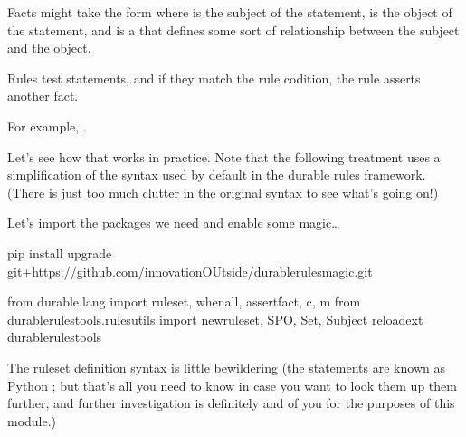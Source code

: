 \documentclass[letterpaper,10pt,english]{sphinxmanual}
\begin{document}
{Facts might take the form  where  is the subject of the statement,  is the object of the statement, and  is a  that defines some sort of relationship between the subject and the object.

Rules test statements, and if they match the rule codition, the rule asserts another fact.

For example, .

Let’s see how that works in practice. Note that the following treatment uses a simplification of the syntax used by default in the durable rules framework. (There is just too much clutter in the original syntax to see what’s going on!)

Let’s import the packages we need and enable some magic…

{
\begin{sphinxVerbatim}[commandchars=\\\{\}]
\llap{\color{nbsphinxin}[ ]:\,\hspace{\fboxrule}\hspace{\fboxsep}}\PYGZsh{}\PYGZpc{}pip install  \PYGZhy{}\PYGZhy{}upgrade git+https://github.com/innovationOUtside/durable\PYGZus{}rules\PYGZus{}magic.git
\end{sphinxVerbatim}
}

{
\begin{sphinxVerbatim}[commandchars=\\\{\}]
\llap{\color{nbsphinxin}[ ]:\,\hspace{\fboxrule}\hspace{\fboxsep}}from durable.lang import ruleset, when\PYGZus{}all, assert\PYGZus{}fact, c, m
from durable\PYGZus{}rules\PYGZus{}tools.rules\PYGZus{}utils import new\PYGZus{}ruleset, SPO, Set, Subject
\PYGZpc{}reload\PYGZus{}ext durable\PYGZus{}rules\PYGZus{}tools
\end{sphinxVerbatim}
}

The ruleset definition syntax is little bewildering (the  statements are known as Python ; but that’s all you need to know in case you want to look them up them further, and further investigation is definitely  and  of you for the purposes of this module.)

}
\end{document}
